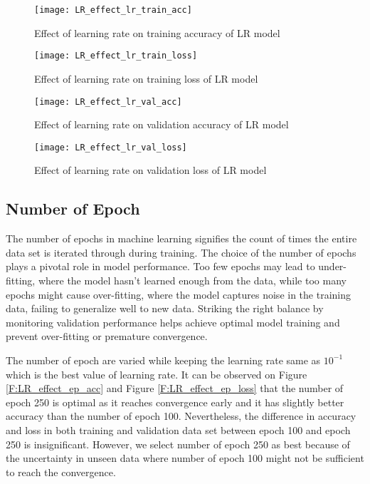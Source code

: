 \documentclass[12pt, a4paper, twoside]{article}
\begin{document}
\begin{figure}[h!]
\centering
\texttt{[image: LR\_effect\_lr\_train\_acc]}
\caption{Effect of learning rate on training accuracy of LR model}
\label{F:LR_effect_lr_train_acc}
\end{figure}
\begin{figure}[h!]
\centering
\texttt{[image: LR\_effect\_lr\_train\_loss]}
\caption{Effect of learning rate on training loss of LR model}
\label{F:LR_effect_lr_train_loss}
\end{figure}
\begin{figure}[h!]
\centering
\texttt{[image: LR\_effect\_lr\_val\_acc]}
\caption{Effect of learning rate on validation accuracy of LR model}
\label{F:LR_effect_lr_val_acc}
\end{figure}
\begin{figure}[h!]
\centering
\texttt{[image: LR\_effect\_lr\_val\_loss]}
\caption{Effect of learning rate on validation loss of LR model}
\label{F:LR_effect_lr_val_loss}
\end{figure}

\subsection{Number of Epoch}\label{SS:lr-ep}
The number of epochs in machine learning signifies the count of times the entire data set is iterated through during training. The choice of the number of epochs plays a pivotal role in model performance. Too few epochs may lead to under-fitting, where the model hasn't learned enough from the data, while too many epochs might cause over-fitting, where the model captures noise in the training data, failing to generalize well to new data. Striking the right balance by monitoring validation performance helps achieve optimal model training and prevent over-fitting or premature convergence.
\par
The number of epoch are varied while keeping the learning rate same as $10^{-1}$ which is the best value of learning rate. It can be observed on Figure \ref{F:LR_effect_ep_acc} and Figure \ref{F:LR_effect_ep_loss} that the number of epoch 250 is optimal as it reaches convergence early and it has slightly better accuracy than the number of epoch 100. Nevertheless, the difference in accuracy and loss in both training and validation data set between epoch 100 and epoch 250 is insignificant. However, we select number of epoch 250 as best because of the uncertainty in unseen data where number of epoch 100 might not be sufficient to reach the convergence.
\end{document}
